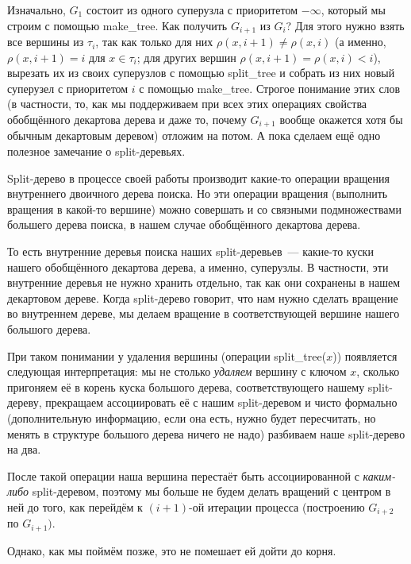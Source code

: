 Изначально, $G_1$ состоит из одного суперузла с приоритетом $-\infty$, который мы строим с помощью \textrm{make\_tree}.
Как получить $G_{i + 1}$ из $G_i$? Для этого нужно взять все
вершины из $\tau_i$, так как только для них $\rho(x, i + 1) \neq \rho(x,i)$ (а именно, $\rho(x, i + 1) = i$ для $x \in \tau_i$; для других вершин $\rho(x, i + 1) = \rho(x, i) < i$),
вырезать их из своих суперузлов с помощью \textrm{split\_tree} и собрать из них новый суперузел с приоритетом $i$ с помощью \textrm{make\_tree}. Строгое понимание этих слов (в частности, то, как мы поддерживаем при всех этих операциях свойства обобщённого декартова дерева и даже то, почему $G_{i + 1}$ вообще окажется хотя бы обычным декартовым деревом) отложим на потом. А пока сделаем ещё одно полезное замечание о split-деревьях.

\begin{remark}
	Split-дерево в процессе своей работы производит какие-то операции вращения внутреннего двоичного дерева поиска. Но эти операции вращения (выполнить вращения в какой-то вершине) можно совершать и со связными подмножествами большего дерева поиска, в нашем случае обобщённого декартова дерева.

	То есть внутренние деревья поиска наших split-деревьев~--- какие-то куски нашего
	обобщённого декартова дерева, а именно, суперузлы. В частности, эти внутренние
	деревья не нужно хранить отдельно, так как они сохранены в нашем декартовом дереве.
	Когда split-дерево говорит, что нам нужно сделать вращение во внутреннем дереве, мы делаем вращение в соответствующей вершине нашего большого дерева.

	При таком понимании у удаления вершины (операции \textrm{split\_tree}($x$)) появляется
	следующая интерпретация: мы не столько \emph{удаляем} вершину с ключом $x$, сколько пригоняем её в корень куска большого дерева, соответствующего нашему split-дереву, прекращаем ассоциировать её с нашим split-деревом и чисто формально (дополнительную информацию, если она есть, нужно будет пересчитать, но менять в структуре большого дерева ничего не надо) разбиваем наше split-дерево на два.

	После такой операции наша вершина перестаёт быть ассоциированной с \emph{каким-либо} split-деревом, поэтому мы больше не будем делать вращений с центром в ней до того, как перейдём к $(i + 1)$-ой итерации процесса (построению $G_{i + 2}$ по $G_{i + 1})$.

	Однако, как мы поймём позже, это не помешает ей дойти до корня.
\end{remark}

